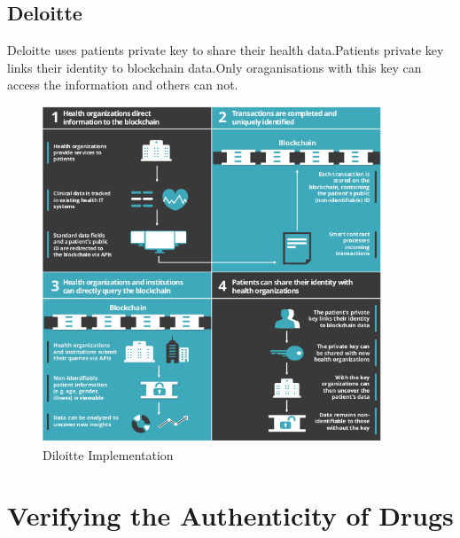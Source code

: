 \documentclass[12pt]{report}
\begin{document}
\subsection{Deloitte\cite{1}}
Deloitte uses patients private key to share their health data.Patients private key links their identity to blockchain data.Only oraganisations with this key can access the information and others can not.
\begin{figure}[H]
\centering
\includegraphics[width=0.9\textwidth]{diloitte.png}
\caption{Diloitte Implementation}
\label{diloitte}
\end{figure}

\section{Verifying the Authenticity of Drugs}
\end{document}
